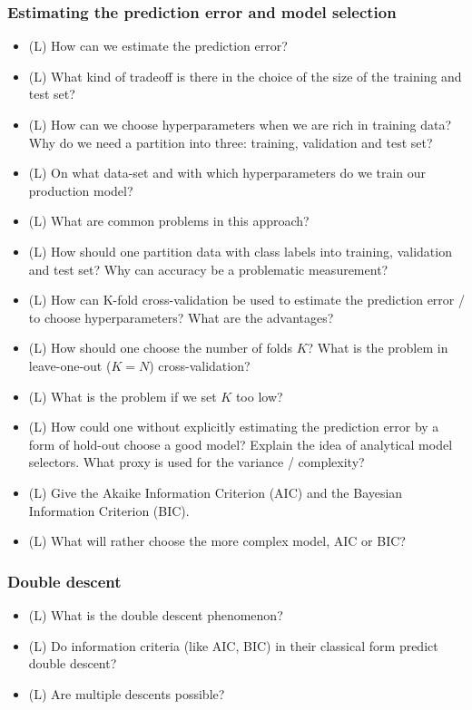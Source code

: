 \subsubsection*{Estimating the prediction error and model selection}
\begin{itemize}
    \item (L) How can we estimate the prediction error?
    \item (L) What kind of tradeoff is there in the choice of the size of the training and test set?
    \item (L) How can we choose hyperparameters when we are rich in training data? Why do we need a
    partition into three: training, validation and test set?
    \item (L) On what data-set and with which hyperparameters do we train our production model?
    \item (L) What are common problems in this approach?
    \item (L) How should one partition data with class labels into training, validation and test set? Why can accuracy be a problematic measurement?
    \item (L) How can K-fold cross-validation be used to estimate the prediction error / to choose hyperparameters? What are the advantages?
    \item (L) How should one choose the number of folds $K$? What is the problem in leave-one-out ($K=N$) cross-validation?
    \item (L) What is the problem if we set $K$ too low?
    \item (L) How could one without explicitly estimating the prediction error by a form of hold-out
    choose a good model? Explain the idea of analytical model selectors. What proxy is used for 
    the variance / complexity?
    \item (L) Give the Akaike Information Criterion (AIC) and the Bayesian Information Criterion (BIC).
    \item (L) What will rather choose the more complex model, AIC or BIC?
\end{itemize}

\subsubsection*{Double descent}
\begin{itemize}
    \item (L) What is the double descent phenomenon?
    \item (L) Do information criteria (like AIC, BIC) in their classical form predict double descent?
    \item (L) Are multiple descents possible?
\end{itemize}

